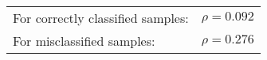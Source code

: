\begin{tabular}{l l}
For correctly classified samples: & $\rho = 0.092$ \\
For misclassified samples: & $\rho = 0.276$ \\
\end{tabular}